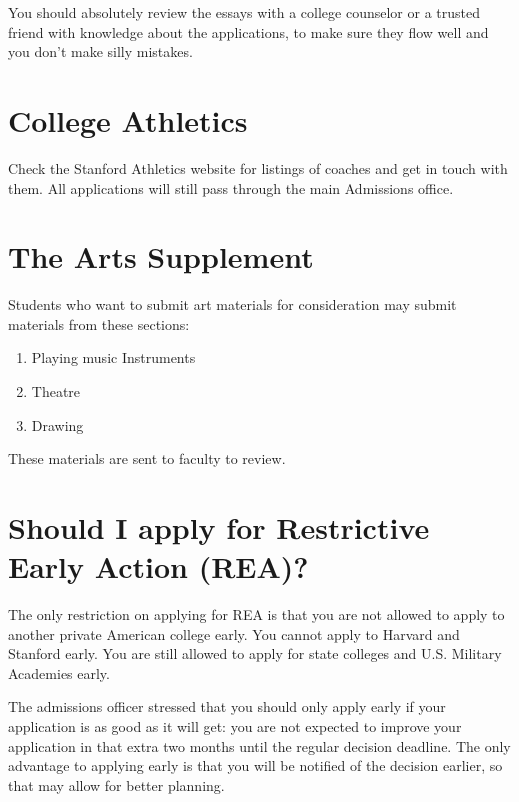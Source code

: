 \documentclass[12pt]{article}
\begin{document}
You should absolutely review the essays with a college counselor or a
trusted friend with knowledge about the applications,
to make sure they flow well and you don't make silly mistakes. 


\section{College Athletics}

Check the Stanford Athletics website for listings of coaches and
get in touch with them. 
All applications will still pass through the main Admissions office.


\section{The Arts Supplement}

Students who want to submit art materials for consideration
may submit materials from these sections:
\begin{enumerate}[(1)]
  \item Playing music Instruments
  \item Theatre
  \item Drawing
\end{enumerate}
These materials are sent to faculty to review. 


\section{Should I apply for Restrictive Early Action (REA)?}

The only restriction on applying for REA is that you are not allowed
to apply to another private American college early.
You cannot apply to Harvard and Stanford early.
You are still allowed to apply for state colleges and U.S. Military
Academies early.

The admissions officer stressed that you should only apply early
if your application is as good as it will get: you are not expected to
improve your application in that extra two months until the regular
decision deadline.
The only advantage to applying early is that you will be notified of the
decision earlier, so that may allow for better planning.
\end{document}
